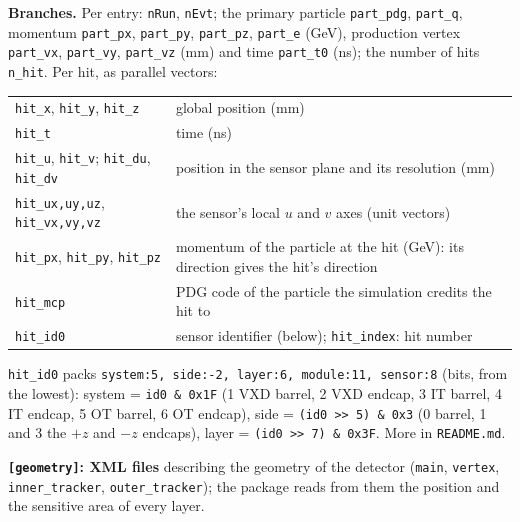 \documentclass[11pt,letterpaper]{article}
\newcommand{\code}[1]{\texttt{#1}}
\begin{document}
\textbf{Branches.} Per entry: \code{nRun}, \code{nEvt}; the primary
particle \code{part\_pdg}, \code{part\_q}, momentum \code{part\_px},
\code{part\_py}, \code{part\_pz}, \code{part\_e} (GeV), production vertex
\code{part\_vx}, \code{part\_vy}, \code{part\_vz} (mm) and time
\code{part\_t0} (ns); the number of hits \code{n\_hit}. Per hit, as
parallel vectors:
\begin{center}\small
\begin{tabularx}{\linewidth}{@{}l X@{}}
\toprule
\code{hit\_x}, \code{hit\_y}, \code{hit\_z} & global position (mm)\\
\code{hit\_t} & time (ns)\\
\code{hit\_u}, \code{hit\_v}; \code{hit\_du}, \code{hit\_dv} & position in the sensor plane and its resolution (mm)\\
\code{hit\_ux,uy,uz}, \code{hit\_vx,vy,vz} & the sensor's local $u$ and $v$ axes (unit vectors)\\
\code{hit\_px}, \code{hit\_py}, \code{hit\_pz} & momentum of the particle at the hit (GeV): its direction gives the hit's direction\\
\code{hit\_mcp} & PDG code of the particle the simulation credits the hit to\\
\code{hit\_id0} & sensor identifier (below); \code{hit\_index}: hit number\\
\bottomrule
\end{tabularx}
\end{center}
\code{hit\_id0} packs \code{system:5, side:-2, layer:6, module:11, sensor:8}
(bits, from the lowest): system = \code{id0 \& 0x1F} (1 VXD barrel, 2 VXD
endcap, 3 IT barrel, 4 IT endcap, 5 OT barrel, 6 OT endcap), side =
\code{(id0 >{}> 5) \& 0x3} (0 barrel, 1 and 3 the $+z$ and $-z$ endcaps),
layer = \code{(id0 >{}> 7) \& 0x3F}. More in \code{README.md}.

\textbf{\code{[geometry]}: XML files} describing the geometry of the
detector (\code{main}, \code{vertex}, \code{inner\_tracker},
\code{outer\_tracker}); the package reads from them the position and the
sensitive area of every layer.
\end{document}
